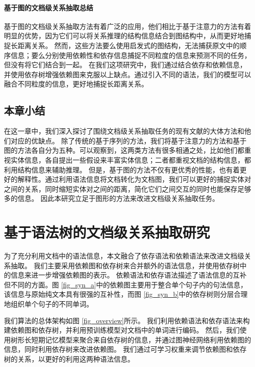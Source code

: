 \documentclass[bachelor]{thesis-uestc}
\begin{document}
\subsubsection{基于图的文档级关系抽取总结}\label{subsec:graph-neural-network}

基于图的文档级关系抽取方法有着广泛的应用，他们相比于基于注意力的方法有着明显的优势，因为它们可以将关系推理的结构信息结合到图结构中，从而更好地捕捉长距离关系。
然而，这些方法要么使用启发式的图结构，无法捕获原文中的顺序信息；要么分别使用依赖性和依存信息捕捉不同粒度的信息来预测不同的任务，但没有将它们结合到一起。
在我们这项研究中，我们通过结合依存和依赖信息，并使用依存树增强依赖图来克服以上缺点。通过引入不同的语法，我们的模型可以融合不同粒度的信息，更好地捕捉长距离关系。

\section{本章小结}

在这一章中，我们深入探讨了围绕文档级关系抽取任务的现有文献的大体方法和他们对应的优缺点。
除了传统的基于序列的方法，我们将基于注意力的方法和基于图的方法各自分为五种。可以观察到，这两类方法有很多相通之处，比如他们都重视实体信息，各自提出一些假设来丰富实体信息；二者都重视文档的结构信息，都利用结构信息来辅助推理。
但是，基于图的方法不仅有更优秀的性能，也有着更好的解释性。通过利用语法信息将文档转化为文档图，我们可以更好的捕捉实体对之间的关系，同时缩短实体对之间的距离，简化它们之间交互的同时也能保存足够多的信息。
因此本研究立足于图形的方法来改进文档级关系抽取任务。


\chapter{基于语法树的文档级关系抽取研究}
为了充分利用文档中的语法信息，本文融合了依存语法和依赖语法来改进文档级关系抽取。
我们主要采用依赖图和依存树来合并额外的语法信息，并使用依存树中的信息来进一步增强依赖图的表示。
依赖语法和依存语法描述了语法信息的互补但不同的方面。图 \ref{fig_syn_a}中的依赖图主要用于整合单个句子内的句法信息，该信息与原始纯文本具有很强的互补性，而图 \ref{fig_syn_b}中的依存树则分层合理地组织单个句子的不同单词。\par

我们算法的总体架构如图 \ref{fig_overview}所示。
我们利用依赖语法和依存语法来构建依赖图和依存树，并利用预训练模型对文档中的单词进行编码。
然后，我们使用树形长短期记忆模型来聚合来自依存树的信息，并通过图神经网络利用依赖图的信息，同时利用依存树来改进依赖图。
我们通过可学习权重来调节依赖图和依存树的关系，以更好的利用这两种语法信息。
\end{document}
